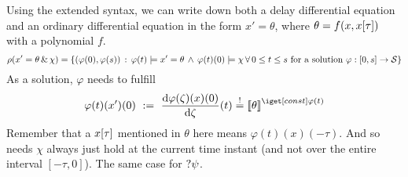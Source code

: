            Using the extended syntax, we can write down both a delay differential equation and an ordinary differential equation in the form $x'=\theta$, where $\theta=f(x,x[\tau])$ with a polynomial $f$.
            \begin{equation}
                \rho(x'=\theta\,\&\,\chi) = \left\{
                    (\varphi(0),\varphi(s))\,:\,\varphi(t)\models x'=\theta\,\wedge\,\varphi(t)(0)\models\chi\,\forall\,0\leq t\leq s\text{ for a solution } \varphi:[0,s]\rightarrow\mathcal{S} \right\}
            \end{equation}
            As a solution, $\varphi$ needs to fulfill
            \begin{equation}
                \varphi(t)(x')(0) \defeq \DD{\varphi(\zeta)(x)(0)}{\zeta}(t) \stackrel{!}{=} \imodel[]{\varphi(t)}{\theta}
            \end{equation}
            Remember that a $x[\tau]$ mentioned in $\theta$ here means $\varphi(t)(x)(-\tau)$.
            And so needs $\chi$ always just hold at the current time instant (and not over the entire interval $[-\tau,0]$). The same case for $?\psi$.

